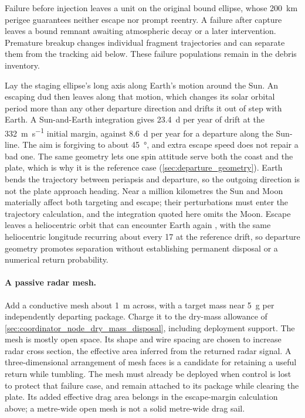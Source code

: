 \documentclass{article}
\begin{document}
Failure before injection leaves a unit on the original bound ellipse, whose \SI{200}{\kilo\meter} perigee guarantees neither escape nor prompt reentry. A failure after capture leaves a bound remnant awaiting atmospheric decay or a later intervention. Premature breakup changes individual fragment trajectories and can separate them from the tracking aid below. These failure populations remain in the debris inventory.

Lay the staging ellipse's long axis along Earth's motion around the Sun. An escaping dud then leaves along that motion, which changes its solar orbital period more than any other departure direction and drifts it out of step with Earth. A Sun-and-Earth integration gives \SI{23.4}{\day} per year of drift at the \SI{332}{\meter\per\second} initial margin, against \SI{8.6}{\day} per year for a departure along the Sun-line. The aim is forgiving to about \SI{45}{\degree}, and extra escape speed does not repair a bad one. The same geometry lets one spin attitude serve both the coast and the plate, which is why it is the reference case (\autoref{sec:departure_geometry}). Earth bends the trajectory between periapsis and departure, so the outgoing direction is not the plate approach heading. Near a million kilometres the Sun and Moon materially affect both targeting and escape; their perturbations must enter the trajectory calculation, and the integration quoted here omits the Moon. Escape leaves a heliocentric orbit that can encounter Earth again \cite{rein2018roadster}, with the same heliocentric longitude recurring about every \SI{17}{\year} at the reference drift, so departure geometry promotes separation without establishing permanent disposal or a numerical return probability.

\paragraph{A passive radar mesh.}
Add a conductive mesh about \SI{1}{\meter} across, with a target mass near \SI{5}{\gram} per independently departing package. Charge it to the dry-mass allowance of \autoref{sec:coordinator_node_dry_mass_disposal}, including deployment support. The mesh is mostly open space. Its shape and wire spacing are chosen to increase radar cross section, the effective area inferred from the returned radar signal. A three-dimensional arrangement of mesh faces is a candidate for retaining a useful return while tumbling. The mesh must already be deployed when control is lost to protect that failure case, and remain attached to its package while clearing the plate. Its added effective drag area belongs in the escape-margin calculation above; a metre-wide open mesh is not a solid metre-wide drag sail.
\end{document}
